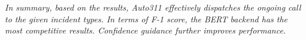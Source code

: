 



\textit{In summary, based on the results, Auto311 effectively dispatches the ongoing call to the given incident types. In terms of F-1 score, the BERT backend has the most competitive results. Confidence guidance further improves performance.}

